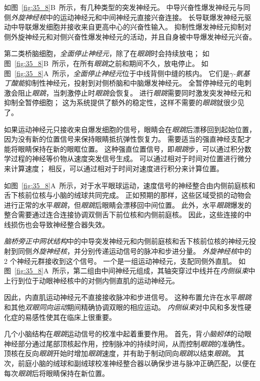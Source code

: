 如图~\ref{fig:35_8}B~所示，有几种类型的突发神经元。
中导兴奋性爆发神经元与同侧\textit{外旋神经核}中的运动神经元和中间神经元直接兴奋连接。
长导联爆发神经元驱动中导联爆发细胞并接收来自更高中心的兴奋性输入。
抑制性爆发神经元抑制对侧外旋神经元和对侧兴奋性爆发神经元的活动，并且自身被中导爆发神经元兴奋。


第二类桥脑细胞，\textit{全面停止神经元}，除了在\textit{眼跳}时会持续放电；
如图~\ref{fig:35_8}B~所示，在所有\textit{眼跳}之前和期间不久，放电停止。
如图~\ref{fig:35_8}A~所示，\textit{全面停止神经元}位于中线背侧中缝的核内。
它们是\textit{$ \gamma $-氨基丁酸能}抑制性神经元，投射到对侧桥脑和中脑爆发神经元。
全暂停神经元的电刺激会阻止\textit{眼跳}，当刺激停止时\textit{眼跳}会恢复。
进行\textit{眼跳}需要同时激发突发神经元和抑制全暂停细胞；
这为系统提供了额外的稳定性，这样不需要的\textit{眼跳}就很少见了。


如果运动神经元只接收来自爆发细胞的信号，眼睛会在\textit{眼跳}后漂移回到起始位置，因为没有新的位置信号来保持眼睛抵抗弹性恢复力。
需要适当的强直神经支配才能将眼睛保持在新的眼眶位置。
这种强直位置信号，即\textit{眼跳}步，可以通过积分数学过程的神经等价物从速度突发信号生成。
可以通过相对于时间对位置进行微分来计算速度；
相反，可以通过相对于时间对速度进行积分来计算位置。


如图~\ref{fig:35_8}A~所示，对于水平眼球运动，速度信号的神经整合由内侧前庭核和舌下核前位核与小脑的绒球共同完成。
正如预期的那样，这些区域受损的动物会进行正常的水平\textit{眼跳}，但\textit{眼跳}后眼睛会漂移回中间位置。
此外，水平\textit{眼跳}爆发的整合需要通过连合连接协调双侧舌下前位核和内侧前庭核。
因此，这些连接的中线损伤也会导致神经整合器失效。


\textit{脑桥旁正中网状结构}中的中导突发神经元和内侧前庭核和舌下核前位核的神经元投射到同侧\textit{外旋神经核}，并分别传递运动信号的脉冲和步进分量。
\textit{外旋神经核}中的 2 个神经元群接收到这个信号。
一个是一组运动神经元，支配同侧外直肌。
如图~\ref{fig:35_8}A~所示，第二组由中间神经元组成，其轴突穿过中线并在\textit{内侧纵束}中上行到位于动眼神经核中的对侧内侧直肌的运动神经元。


因此，内直肌运动神经元不直接接收脉冲和步进信号。
这种布置允许在水平\textit{眼跳}和其他\textit{双眼同向运动}期间精确协调双眼的相应运动。
\textit{内侧纵束}对中风和多发性硬化症的易感性使其在临床上很重要。


几个小脑结构在\textit{眼跳}运动信号的校准中起着重要作用。
首先，背\textit{小脑蚓体}的动眼神经部分通过尾部顶核起作用，控制脉冲的持续时间，从而控制\textit{眼跳}的准确性。
顶核在反向\textit{眼跳}开始时增加\textit{眼跳}速度，并有助于制动同向\textit{眼跳}以结束\textit{眼跳}。
其次，前庭小脑的绒球和副绒球校准神经整合器以确保步进与脉冲正确匹配，以便在每次\textit{眼跳}后将眼睛保持在新位置。



